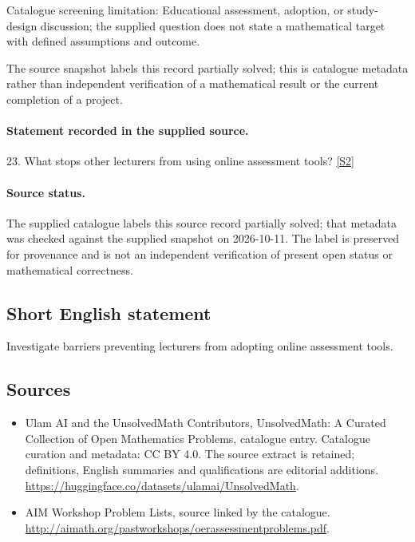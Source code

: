 \documentclass[11pt]{article}
\begin{document}
Catalogue screening limitation: Educational assessment, adoption, or study-design discussion; the supplied question does not state a mathematical target with defined assumptions and outcome.

The source snapshot labels this record partially solved; this is catalogue metadata rather than independent verification of a mathematical result or the current completion of a project.
\paragraph{Statement recorded in the supplied source.}
23. What stops other lecturers from using online assessment tools? \href{http://aimath.org/pastworkshops/oerassessmentproblems.pdf}{[S2]}
\paragraph{Source status.}
The supplied catalogue labels this source record partially solved; that metadata was checked against the supplied snapshot on 2026-10-11. The label is preserved for provenance and is not an independent verification of present open status or mathematical correctness.
\subsection{Short English statement}
Investigate barriers preventing lecturers from adopting online assessment tools.
\subsection{Sources}
\begin{itemize}
\item[S1] Ulam AI and the UnsolvedMath Contributors, UnsolvedMath: A Curated Collection of Open Mathematics Problems, catalogue entry. Catalogue curation and metadata: CC BY 4.0. The source extract is retained; definitions, English summaries and qualifications are editorial additions.
\url{https://huggingface.co/datasets/ulamai/UnsolvedMath}.
\item[S2] AIM Workshop Problem Lists, source linked by the catalogue.
\url{http://aimath.org/pastworkshops/oerassessmentproblems.pdf}.
\end{itemize}
\end{document}
